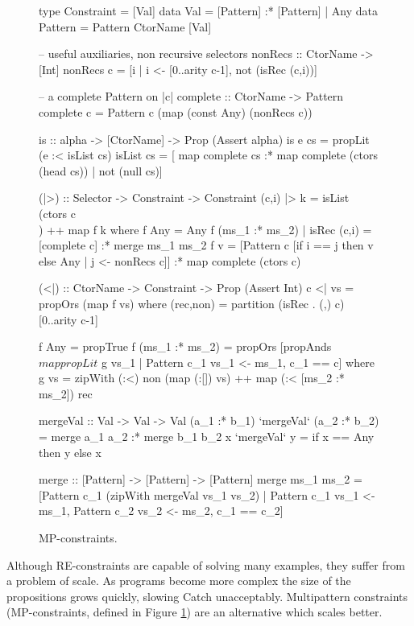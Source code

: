 \documentclass[preprint]{sigplanconf}
\begin{document}
\begin{figure}
\begin{code}
type Constraint  =  [Val]
data Val         =  [Pattern] :* [Pattern] |  Any
data Pattern     =  Pattern CtorName [Val]

-- useful auxiliaries, non recursive selectors
nonRecs :: CtorName -> [Int]
nonRecs c = [i | i <- [0..arity c-1], not (isRec (c,i))]

-- a complete Pattern on |c|
complete :: CtorName -> Pattern
complete c = Pattern c (map (const Any) (nonRecs c))


is :: alpha -> [CtorName] -> Prop (Assert alpha)
is e cs = propLit (e :< isList cs)
isList cs =  [  map complete cs :* map complete (ctors (head cs))
             |  not (null cs)]

(|>) :: Selector -> Constraint -> Constraint
(c,i) |> k = isList (ctors c \\ [c]) ++ map f k
    where
    f Any = Any
    f (ms_1 :* ms_2) | isRec (c,i) = [complete c] :* merge ms_1 ms_2
    f v =  [Pattern c [if i == j then v else Any | j <- nonRecs c]]
           :* map complete (ctors c)

(<|) :: CtorName -> Constraint -> Prop (Assert Int)
c <| vs = propOrs (map f vs)
    where
    (rec,non) = partition (isRec . (,) c) [0..arity c-1]

    f Any = propTrue
    f (ms_1 :* ms_2) = propOrs  [propAnds $ map propLit $ g vs_1
                                | Pattern c_1 vs_1 <- ms_1, c_1 == c]
        where g vs =  zipWith (:<) non (map (:[]) vs) ++
                      map (:< [ms_2 :* ms_2]) rec

mergeVal :: Val -> Val -> Val
(a_1 :* b_1)  `mergeVal`  (a_2 :* b_2)  = merge a_1 a_2 :* merge b_1 b_2
x             `mergeVal`  y             = if x == Any then y else x

merge :: [Pattern] -> [Pattern] -> [Pattern]
merge  ms_1 ms_2 = [Pattern c_1 (zipWith mergeVal vs_1 vs_2) |
       Pattern c_1 vs_1 <- ms_1, Pattern c_2 vs_2 <- ms_2, c_1 == c_2]
\end{code}
\caption{MP-constraints.}
\label{fig:enumeration}
\end{figure}

Although RE-constraints are capable of solving many examples, they suffer from a problem of scale. As programs become more complex the size of the propositions grows quickly, slowing Catch unacceptably. Multipattern constraints (MP-constraints, defined in Figure \ref{fig:enumeration}) are an alternative which scales better.
\end{document}
